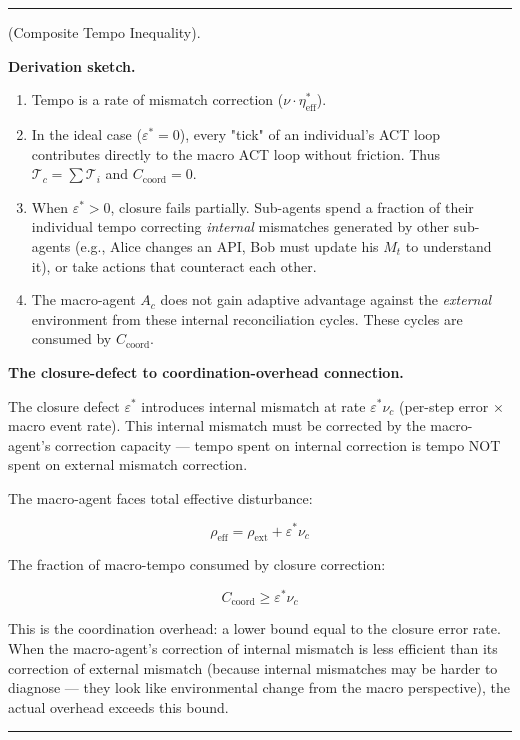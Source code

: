 \documentclass[11pt,oneside]{article}
\newcounter{claim}[section]
\renewcommand{\theclaim}{\thesection.\arabic{claim}}
\newenvironment{segment}[2]{%
  \refstepcounter{claim}%
  \bigskip\noindent\hrule\smallskip
  \noindent{\bfseries #1~\theclaim}\enskip(#2).\par\smallskip
  \noindent\ignorespaces
}{%
  \par\smallskip\noindent\hrule\bigskip
}
\newenvironment{sketch}[1][]{\begin{segment}{Sketch}{#1}}{\end{segment}}
\begin{document}
\begin{sketch}[Composite Tempo Inequality]
\medskip\noindent\textbf{Derivation sketch.}


\begin{enumerate}
  \item Tempo is a rate of mismatch correction ($\nu \cdot \eta^*_{\text{eff}}$).
  \item In the ideal case ($\varepsilon^* = 0$), every "tick" of an individual's ACT loop contributes directly to the macro ACT loop without friction. Thus $\mathcal T_c = \sum \mathcal T_i$ and $C_{\text{coord}} = 0$.
  \item When $\varepsilon^* > 0$, closure fails partially. Sub-agents spend a fraction of their individual tempo correcting \textit{internal} mismatches generated by other sub-agents (e.g., Alice changes an API, Bob must update his $M_t$ to understand it), or take actions that counteract each other.
  \item The macro-agent $A_c$ does not gain adaptive advantage against the \textit{external} environment from these internal reconciliation cycles. These cycles are consumed by $C_{\text{coord}}$.
\end{enumerate}



\medskip\noindent\textbf{The closure-defect to coordination-overhead connection.}



The closure defect $\varepsilon^*$ introduces internal mismatch at rate $\varepsilon^* \nu_c$ (per-step error × macro event rate). This internal mismatch must be corrected by the macro-agent's correction capacity — tempo spent on internal correction is tempo NOT spent on external mismatch correction.

The macro-agent faces total effective disturbance:

$$\rho_{\text{eff}} = \rho_{\text{ext}} + \varepsilon^* \nu_c$$

The fraction of macro-tempo consumed by closure correction:

$$C_{\text{coord}} \geq \varepsilon^* \nu_c$$

This is the coordination overhead: a lower bound equal to the closure error rate. When the macro-agent's correction of internal mismatch is less efficient than its correction of external mismatch (because internal mismatches may be harder to diagnose — they look like environmental change from the macro perspective), the actual overhead exceeds this bound.


\end{sketch}
\end{document}
